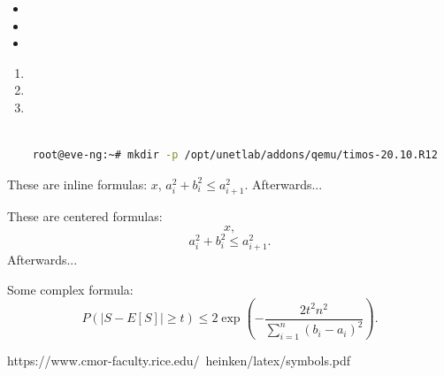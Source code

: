 





\begin{itemize}
    \item 
    \item 
    \item 
\end{itemize}


\begin{enumerate}
    \item 
    \item 
    \item 
\end{enumerate}






    \lstset{style=mystyle} %
    
    \begin{lstlisting}[language=bash, caption= code caption]
    
    root@eve-ng:~# mkdir -p /opt/unetlab/addons/qemu/timos-20.10.R12

    \end{lstlisting}





These are inline formulas: $x$, $a_i^2 + b_i^2 \le a_{i+1}^2$. Afterwards...

These are centered formulas: $$x,$$ $$a_i^2 + b_i^2 \le a_{i+1}^2.$$ Afterwards...

Some complex formula: $$P(|S - E[S]| \ge t) \le 2 \exp \left( -\frac{2 t^2 n^2}{\sum_{i = 1}^n (b_i - a_i)^2} \right).$$


https://www.cmor-faculty.rice.edu/~heinken/latex/symbols.pdf
